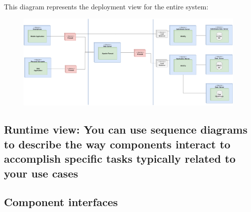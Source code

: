 \documentclass[12pt,a4paper]{article}
\begin{document}
\newpage
This diagram represents the deployment view for the entire system:
\begin{figure}[H]
\begin{adjustwidth}{-25mm}{-25mm}
				\centering				
					        \includegraphics[width=0.9\paperwidth]{Images/deploymentView}
\end{adjustwidth}
			\end{figure}
\subsection{Runtime view: You can use sequence diagrams to describe the way components interact to accomplish specific tasks typically related to your use cases}
\subsection{Component interfaces}
\end{document}
